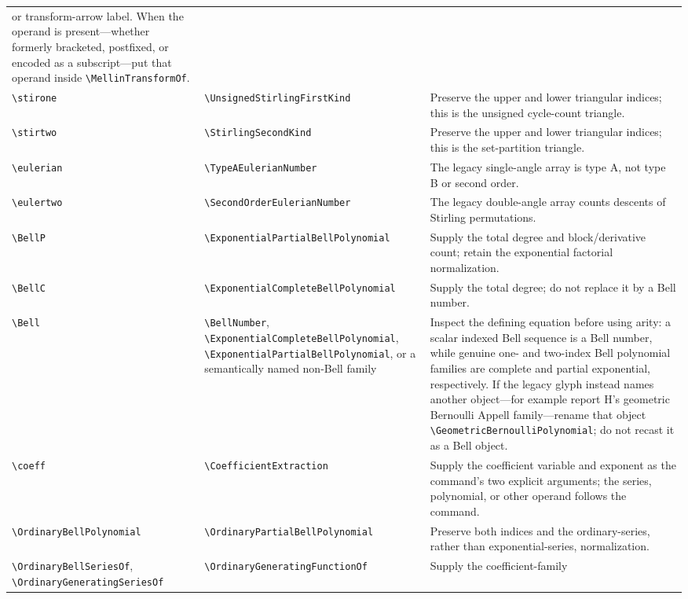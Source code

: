 \documentclass[11pt,oneside]{article}
\theoremstyle{definition}
\theoremstyle{remark}
\DeclareRobustCommand{\commandname}[1]{\texttt{\textbackslash#1}}
\begin{document}
\begin{longtable}{@{}p{}p{}p{}@{}}
or transform-arrow label.  When the operand is present---whether formerly bracketed,
postfixed, or encoded as a subscript---put that operand inside
\commandname{MellinTransformOf}.\\
\commandname{stirone} & \commandname{UnsignedStirlingFirstKind} & Preserve the
upper and lower triangular indices; this is the unsigned cycle-count triangle.\\
\commandname{stirtwo} & \commandname{StirlingSecondKind} & Preserve the upper
and lower triangular indices; this is the set-partition triangle.\\
\commandname{eulerian} & \commandname{TypeAEulerianNumber} & The legacy
single-angle array is type A, not type B or second order.\\
\commandname{eulertwo} & \commandname{SecondOrderEulerianNumber} & The legacy
double-angle array counts descents of Stirling permutations.\\
\commandname{BellP} & \commandname{ExponentialPartialBellPolynomial} & Supply
the total degree and block/derivative count; retain the exponential factorial
normalization.\\
\commandname{BellC} & \commandname{ExponentialCompleteBellPolynomial} & Supply
the total degree; do not replace it by a Bell number.\\
\commandname{Bell} & \commandname{BellNumber},
\commandname{ExponentialCompleteBellPolynomial},
\commandname{ExponentialPartialBellPolynomial}, or a semantically named
non-Bell family & Inspect the defining equation before using arity: a scalar
indexed Bell sequence is a Bell number, while genuine one- and two-index Bell
polynomial families are complete and partial exponential, respectively.  If
the legacy glyph instead names another object---for example report H's
geometric Bernoulli Appell family---rename that object
\commandname{GeometricBernoulliPolynomial}; do not recast it as a Bell object.\\
\commandname{coeff} & \commandname{CoefficientExtraction} & Supply the
coefficient variable and exponent as the command's two explicit arguments;
the series, polynomial, or other operand follows the command.\\
\commandname{OrdinaryBellPolynomial} &
\commandname{OrdinaryPartialBellPolynomial} & Preserve both indices and the
ordinary-series, rather than exponential-series, normalization.\\
\commandname{OrdinaryBellSeriesOf},
\commandname{OrdinaryGeneratingSeriesOf} &
\commandname{OrdinaryGeneratingFunctionOf} & Supply the coefficient-family

\end{longtable}
\end{document}
